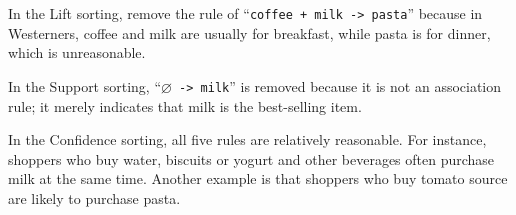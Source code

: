 \documentclass{article}
\begin{document}
In the Lift sorting, remove the rule of ``{\tt coffee + milk -> pasta}'' because in Westerners, coffee and milk are usually for breakfast, while pasta is for dinner, which is unreasonable.

In the Support sorting, ``{\tt $\varnothing$ -> milk}'' is removed because it is not an association rule; it merely indicates that milk is the best-selling item.

In the Confidence sorting, all five rules are relatively reasonable. For instance, shoppers who buy water, biscuits or yogurt and other beverages often purchase milk at the same time. Another example is that shoppers who buy tomato source are likely to purchase pasta.
\end{document}
